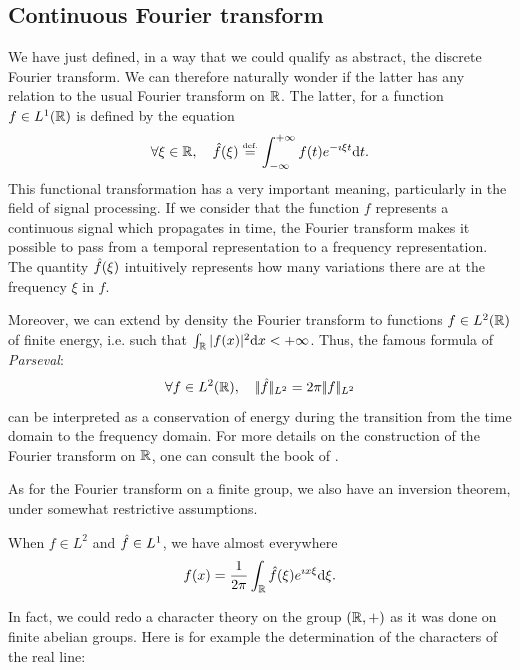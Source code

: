 \subsection{Continuous Fourier transform}
\label{sect2-transforme-fourier-continue} 
 
 
 We have just defined, in a way that we could qualify as abstract, the discrete Fourier transform. We can therefore naturally wonder if the latter has any relation to the usual Fourier transform on $ \mathbb{R} $. The latter, for a function $ f \in L^1 (\mathbb{R}) $ is defined by the equation
\begin{equation}
\label{eq-transforme-fourier-R}
\forall \xi \in \mathbb{R}, \quad \hat{f} (\xi) \stackrel{\mbox{\upshape\tiny def.}}{=} \int_{-\infty}^{+\infty}{f(t) e^{- \imath \xi t} \mathrm{d} t}.
\end{equation}
This functional transformation has a very important meaning, particularly in the field of signal processing. If we consider that the function $ f $ represents a continuous signal which propagates in time, the Fourier transform makes it possible to pass from a temporal representation to a frequency representation. The quantity $ \hat{f} (\xi) $ intuitively represents how many variations there are at the frequency $ \xi $ in $ f $.
 
 
Moreover, we can extend by density the Fourier transform to functions $ f \in L^2 (\mathbb{R}) $ of finite energy, i.e. such that $ \int_{\mathbb{R}}{| f(x) |^2 \mathrm{d} x} <+ \infty $. Thus, the famous formula of \textit{Parseval}:
\begin{equation*}
\forall f \in L^2 (\mathbb{R}), \quad |\!| \hat{f} |\!|_{L^2} = 2 \pi |\!| f |\!|_{L^2}
\end{equation*}
can be interpreted as a conservation of energy during the transition from the time domain to the frequency domain. For more details on the construction of the Fourier transform on $ \mathbb{R} $, one can consult the book of  \cite{rudin}.
 
 
As for the Fourier transform on a finite group, we also have an inversion theorem, under somewhat restrictive assumptions.
 
\begin{prop}
 When $ f \in L^2 $ and $ \hat{f} \in L^1 $, we have almost everywhere
\begin{equation}
\label{eq-formula-inversion-R}
f(x) = \frac{1}{2 \pi} \int_{\mathbb{R}}{\hat{f} (\xi) e^{\imath x \xi} \mathrm{d} \xi}.
\end{equation}
\end{prop}
In fact, we could redo a character theory on the group $ (\mathbb{R}, +) $ as it was done on finite abelian groups. Here is for example the determination of the characters of the real line:
 
